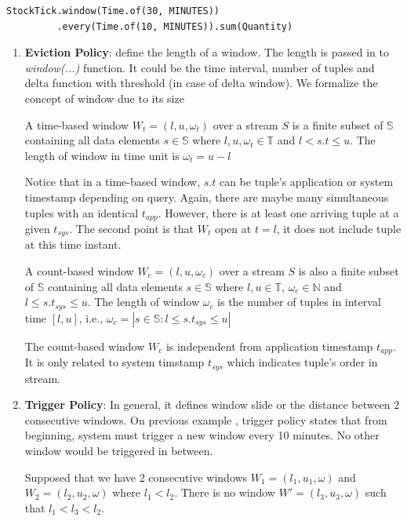 \begin{verbatim}
StockTick.window(Time.of(30, MINUTES))
		 .every(Time.of(10, MINUTES)).sum(Quantity)
\end{verbatim}

\begin{enumerate}

\item \textbf{Eviction Policy}: define the length of a window. The length is passed in to \textit{window(...)} function. It could be the time interval, number of tuples and delta function with threshold (in case of delta window).
We formalize the concept of window due to its size

\begin{defi}
A time-based window $W_{t} = (l,u,\omega_t)$ over a stream $S$ is a finite subset of  $\mathbb{S}$ containing all data elements $s \in \mathbb{S}$ where $l , u, \omega_t \in \mathbb{T}$ and $l < s.t \leq u$. The length of window in time unit is $\omega_t = u-l$
\end{defi}
Notice that in a time-based window, $s.t$ can be tuple's application or system timestamp depending on query. Again, there are maybe many simultaneous tuples with an identical $t_{app}$. However, there is at least one arriving tuple at a given $t_{sys}$. The second point is that $W_t$ open at $t = l$, it does not include tuple at this time instant.

\begin{defi}
A count-based window $W_{c} = (l,u,\omega_c)$ over a stream $S$ is also a finite subset of  $\mathbb{S}$ containing all data elements $s \in \mathbb{S}$ where $l,u \in \mathbb{T}$, $\omega_c \in \mathbb{N}$ and $l \leq s.t_{sys} \leq u$. The length of window $\omega_c$ is the number of tuples in interval time $[l, u]$, i.e., $\omega_c = | {s \in \mathbb{S}: l \leq s.t_{sys} \leq u}|$
\end{defi}
The count-based window $W_{c}$ is independent from application timestamp $t_{app}$. It is only related to system timstamp $t_{sys}$ which indicates tuple's order in stream. 


\item \textbf{Trigger Policy}: In general, it defines window slide or the distance between 2 consecutive windows. On previous example , trigger policy states that from beginning, system must trigger a new window every 10 minutes. No other window would be triggered in between.

Supposed that we have 2 consecutive windows $W_1 = (l_1, u_1, \omega)$ and $W_2 = (l_2, u_2, \omega)$  where $l_1 < l_2$. There is no window $W' = (l_3, u_3, \omega)$ such that $l_1< l_3 < l_2$.


\end{enumerate}
